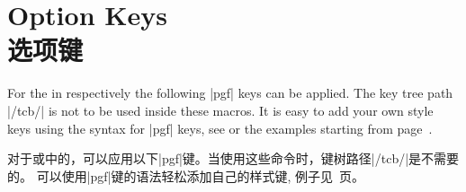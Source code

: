 \setcounter{section}{3}
\setcounter{subsection}{0}
\setcounter{subsubsection}{0}

\section{Option Keys\\选项键}\label{sec:optkeys}%


For the  in  respectively 
the following |pgf| keys can be applied. The key tree path |/tcb/| is not to
be used inside these macros. It is easy to add your own style keys using
the syntax for |pgf| keys, see \cite{tantau:tikz_and_pgf,sturm:latex} or the examples
starting from page~\pageref{sec:latextutorial}.

对于或中的，可以应用以下|pgf|键。当使用这些命令时，键树路径|/tcb/|是不需要的。%
可以使用|pgf|键的语法轻松添加自己的样式键, 例子见~\pageref{sec:latextutorial}页。%
  


